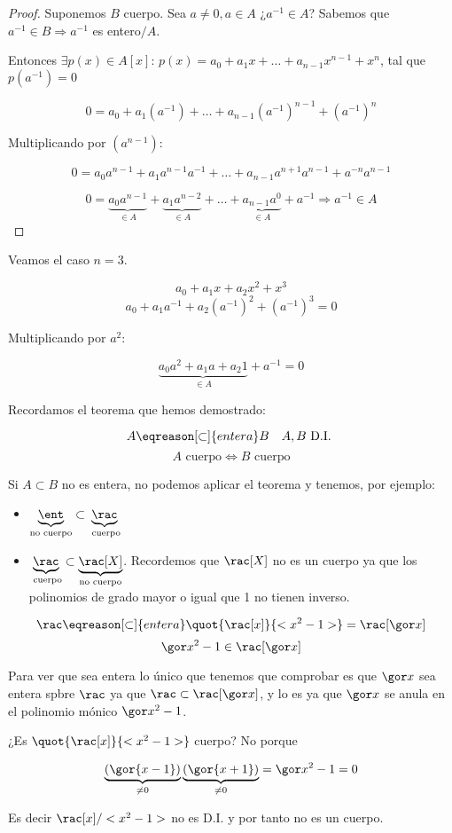 \begin{proof}
		\proofpart{$\Leftarrow$}

		Suponemos $B$ cuerpo. Sea $a \neq 0,a \in A$ ¿$a^{-1} \in A$? Sabemos que $a^{-1} \in B \Rightarrow a^{-1}$ es entero$/A$.

		Entonces $\exists p(x) \in A[x]$: $p(x) = a_0 + a_1x + … + a_{n-1}x^{n-1} + x^n $, tal que $p(a^{-1})=0$

		\[ 0 = a_0 + a_1(a^{-1}) + … + a_{n-1}(a^{-1})^{n-1} + (a^{-1})^n \]

		Multiplicando por $(a^{n-1})$:

		\[ 0 = a_0 a^{n-1} + a_1 a^{n-1} a^{-1} + … + a_{n-1} a^{n+1} a^{n-1} + a^{-n} a^{n-1} \]

		\[ 0 = \underbrace{a_0 a^{n-1}}_{\in A} + \underbrace{a_1 a^{n-2}}_{\in A} + … + \underbrace{a_{n-1}a^0}_{\in A} + a^{-1} \Rightarrow a^{-1} \in A \]


	\end{proof}

	\begin{example}
		Veamos el caso $n = 3$.

		\[ a_0 + a_1 x + a_2 x^2 + x^3 \]
		\[ a_0 + a_1 a^{-1} + a_2 (a^{-1})^2  + (a^{-1})^3 = 0 \]

		Multiplicando por $a^2$:

		\[ \underbrace{a_0 a^2 + a_1 a + a_2 1}_{\in A} + a^{-1} = 0\]
	\end{example}

	Recordamos el teorema que hemos demostrado:

	\[ A \eqreason[\subset]{entera} B \quad A,B \text{ D.I. }\]
	\[ A \text{ cuerpo} \Leftrightarrow B \text{ cuerpo} \]

	\begin{example}[1]
		Si $A \subset B$ no es entera, no podemos aplicar el teorema y tenemos, por ejemplo:
		\begin{itemize}
			\item $\underbrace{\ent}_{\text{no cuerpo}} \subset \underbrace{\rac}_{\text{ cuerpo}}$
			\item $\underbrace{\rac}_{\text{ cuerpo}} \subset \underbrace{\rac[X]}_{\text{no cuerpo}}$. Recordemos que $\rac[X]$ no es un cuerpo ya que los polinomios de grado mayor o igual que 1 no tienen inverso.
		\end{itemize}
	\end{example}

	\begin{example}[2]
		\[ \rac \eqreason[\subset]{entera} \quot{\rac[x]}{<x^2-1>} = \rac[\cls{x}] \]
		\[ \cls{x}^2 - 1 \in \rac[\cls{x}] \]
		
		Para ver que sea entera lo único que tenemos que comprobar es que $\cls{x}$ sea entera spbre $\rac$ ya que $\rac \subset \rac[\cls{x}]$, y lo es ya que  $\cls{x}$ se anula en el polinomio mónico $\cls{x}^2 - 1$.

		¿Es $\quot{\rac[x]}{<x^2-1>}$ cuerpo? No porque

		\[ \underbrace{(\gor{x-1})}_{\neq 0} \underbrace{(\gor{x+1})}_{\neq 0}  = \cls{x^2-1} = 0\]

		Es decir $\rac[x]/<x^2-1>$ no es D.I. y por tanto no es un cuerpo.
	\end{example}

